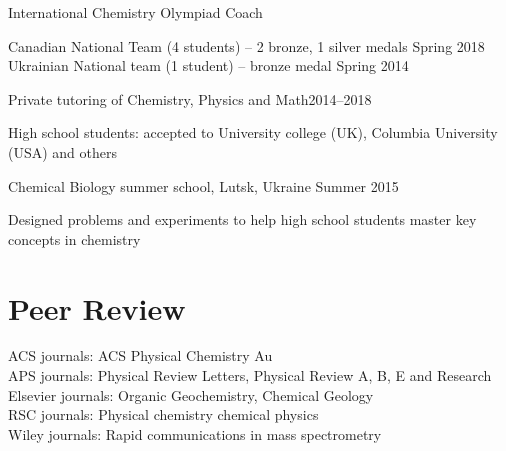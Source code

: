 \documentclass[margin,line]{res}
\newenvironment{list1}{
  \begin{list}{\ding{113}}{%
      \setlength{\itemsep}{0in}
      \setlength{\parsep}{0in} \setlength{\parskip}{0in}
      \setlength{\topsep}{0in} \setlength{\partopsep}{0in} 
      \setlength{\leftmargin}{0.17in}}}{\end{list}}
\begin{document}
\begin{resume}
\vspace{-0.3cm}

International Chemistry Olympiad Coach
\begin{list1}
\item[]Canadian National  Team (4 students) -- 2 bronze, 1 silver medals \hfill{Spring 2018}\\
Ukrainian National team (1 student) -- bronze medal \hfill{Spring 2014}
\end{list1}

\vspace{-0.3cm}

Private tutoring of Chemistry, Physics and Math\hfill{2014--2018}

\begin{list1}
\item[]High school students: accepted to University college (UK), Columbia University (USA) and others
\end{list1}

\vspace{-0.3cm}

Chemical Biology summer school, Lutsk, Ukraine \hfill{Summer 2015}

\begin{list1}
\item[]
Designed problems and experiments to help high school students master key concepts in chemistry
\end{list1}

\section{\sc Peer Review}
ACS journals: ACS Physical Chemistry Au\\
APS journals: Physical Review Letters, Physical Review A, B, E and Research\\
Elsevier journals: Organic Geochemistry, Chemical Geology\\
RSC journals: Physical chemistry chemical physics\\
Wiley journals: Rapid communications in mass spectrometry

\end{resume}
\newpage

\pagestyle{headings}
\end{document}
